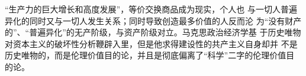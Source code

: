

“生产力的巨大增长和高度发展”\cite[538]{maenwen1}，等价交换商品成为现实，个人也
与一切人普遍异化的同时又与一切人发生关系；同时导致创造最多价值的人反而沦
为“没有财产的”、“普遍异化”的无产阶级，与资产阶级对立。马克思政治经济学基
于历史唯物对资本主义的破坏性分析鞭辟入里，但是他求得建设性的共产主义自身却并
不是历史唯物的，而是伦理价值目的论，并且是彻底偏离了“科学”二字的伦理价值目
的论。



